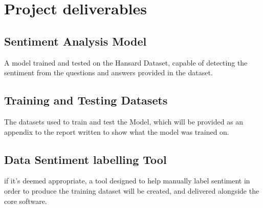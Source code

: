 \documentclass[11pt,fleqn,twoside]{article}
\begin{document}
\section{Project deliverables}
\subsection{Sentiment Analysis Model}
A model trained and tested on the Hansard Dataset, capable of detecting the sentiment from the questions and answers provided in the dataset.
\subsection{Training and Testing Datasets}
The datasets used to train and test the Model, which will be provided as an appendix to the report written to show what the model was trained on.
\subsection{Data Sentiment labelling Tool}
if it's deemed appropriate, a tool designed to help manually label sentiment in order to produce the training dataset will be created, and delivered alongside the core software.
\clearpage

%
%
\section*{}
%

\end{document}
